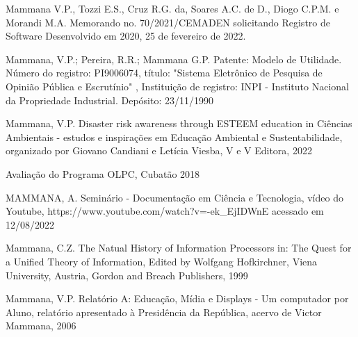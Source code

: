 \begin{flushleft}
[MAMMANA et al., 2022] Mammana V.P., Tozzi E.S., Cruz R.G. da, Soares A.C. de D., Diogo C.P.M. e Morandi M.A. Memorando no. 70/2021/CEMADEN solicitando Registro de Software Desenvolvido em 2020, 25 de fevereiro de 2022.
\end{flushleft}


\begin{flushleft}
[MAMMANA et al., 1990] Mammana, V.P.; Pereira, R.R.; Mammana G.P. Patente: Modelo de Utilidade. Número do registro: PI9006074, título: "Sistema Eletrônico de Pesquisa de Opinião Pública e Escrutínio" , Instituição de registro: INPI - Instituto Nacional da Propriedade Industrial. Depósito: 23/11/1990
\end{flushleft}


\begin{flushleft}
[MAMMANA et al., 2022a] Mammana, V.P. Disaster risk awareness through ESTEEM education in Ciências Ambientais - estudos e inspirações em Educação Ambiental e Sustentabilidade, organizado por Giovano Candiani e Letícia Viesba, V e V Editora, 2022
\end{flushleft}


\begin{flushleft}
 Avaliação do Programa OLPC, Cubatão 2018
\end{flushleft}


\begin{flushleft}
[MAMMANA, 2020] MAMMANA, A. Seminário - Documentação em Ciência e Tecnologia, vídeo do Youtube, https://www.youtube.com/watch?v=-ek\_EjIDWnE acessado em 12/08/2022
\end{flushleft}


\begin{flushleft}
[MAMMANA, 1999] Mammana, C.Z. The Natual History of Information Processors in: The Quest for a Unified Theory of Information, Edited by Wolfgang Hofkirchner, Viena University, Austria, Gordon and Breach Publishers, 1999
\end{flushleft}




\begin{flushleft}
[MAMMANA, 2006] Mammana, V.P. Relatório A: Educação, Mídia e Displays - Um computador por Aluno, relatório apresentado à Presidência da República, acervo de Victor Mammana, 2006
\end{flushleft}


